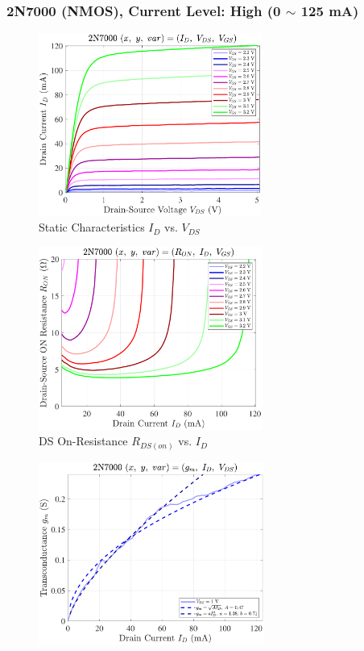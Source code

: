 \documentclass[UTF8]{article}
\begin{document}
\newpage
\subsubsection{2N7000 (NMOS), Current Level: High (0 $\sim$ 125 mA)}


\begin{center}
    \noindent\begin{minipage}{0.45\columnwidth}
        \begin{figure}[H]\centering
            \includegraphics[height=170pt]{LCE-04-场效应管/assets/2N7000/2N7000 (NMOS) [onsemi, KH32] current level high/2025-04-24_00-52-18__stc_Id_Vds_Vgs.pdf}
            \caption{Static Characteristics $I_D$ vs. $V_{DS}$}
        \end{figure}
        \begin{figure}[H]\centering
            \includegraphics[height=170pt]{LCE-04-场效应管/assets/2N7000/2N7000 (NMOS) [onsemi, KH32] current level high/2025-04-24_00-52-28__stc_Ron_Id_Vgs.pdf}
            \caption{DS On-Resistance $R_{DS(on)}$ vs. $I_D$}
        \end{figure}
        \begin{figure}[H]\centering
            \includegraphics[height=170pt]{LCE-04-场效应管/assets/2N7000/2N7000 (NMOS) [onsemi, KH32] current level high/2025-04-24_00-52-33__stc_gm_Id_Vds.pdf}

\end{figure}
\end{minipage}
\end{center}
\end{document}
